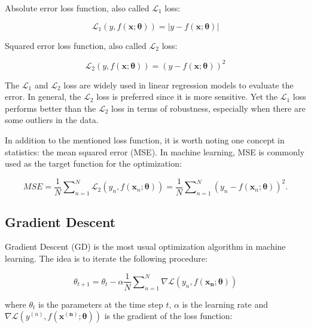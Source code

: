 \documentclass[
	parskip, 			   %
	twoside, 			   %
	DIV=14, 			   %
	BCOR=15.0mm, 		   %
	headsepline, 		   %
	open=right, 		   %
	captions=tableheading, %
	bibliography=totoc,    %
	numbers=noenddot       %
]{scrreprt}
\begin{document}
Absolute error loss function, also called $\mathcal{L}_{1}$ loss:

\begin{equation}
    \label{eq:AE_loss}
    \mathcal{L}_{1}\left( y,f(\mathbf{x};\mathbf{\theta}) \right) = |y-f(\mathbf{x};\mathbf{\theta})|
\end{equation}

Squared error loss function, also called $\mathcal{L}_{2}$ loss:

\begin{equation}
    \label{eq:SE_loss}
    \mathcal{L}_{2}\left( y,f(\mathbf{x};\mathbf{\theta}) \right) = (y-f(\mathbf{x};\mathbf{\theta}))^2
\end{equation}

The $\mathcal{L}_{1}$ and $\mathcal{L}_{2}$ loss are widely used in linear regression models to evaluate the error. In general, the $\mathcal{L}_{2}$ loss is preferred since it is more sensitive. Yet the $\mathcal{L}_{1}$ loss performs better than the $\mathcal{L}_{2}$ loss in terms of robustness, especially when there are some outliers in the data.

In addition to the mentioned loss function, it is worth noting one concept in statistics: the mean squared error (MSE). In machine learning, MSE is commonly used as the target function for the optimization:

\begin{equation}
    \label{eq:MSE}
    MSE = \frac{1}{N} \sum\nolimits_{n=1}^N \mathcal{L}_{2}\left( y_n,f(\mathbf{x}_n;\mathbf{\theta}) \right) = \frac{1}{N} \sum\nolimits_{n=1}^N (y_n-f(\mathbf{x}_n;\mathbf{\theta}))^2.
\end{equation}


\subsection{Gradient Descent}
Gradient Descent (GD) is the most usual optimization algorithm in machine learning. The idea is to iterate the following procedure:

\begin{equation}
    \label{eq:GD}
    \theta_{t+1} = \theta_{t} - \alpha \frac{1}{N} \sum\nolimits_{n=1}^N \nabla \mathcal{L}\left( y_{n},f(\mathbf{x_{n}};\mathbf{\theta}) \right)
\end{equation}

where $\theta_{t}$ is the parameters at the time step $t$, $\alpha$ is the learning rate and $\nabla \mathcal{L}\left( y^{(n)},f(\mathbf{x^{(n)}};\mathbf{\theta}) \right)$ is the gradient of the loss function:
\end{document}
